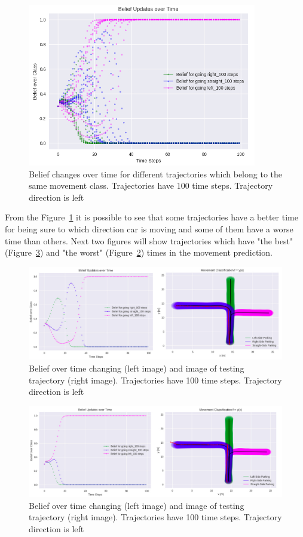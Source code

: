 \begin{figure}[H]
	\centering  	
	\includegraphics[width=10cm]{img/10_lefts.jpg}
	\caption{Belief changes over time for different trajectories which belong to the same movement class. Trajectories have 100 time steps. Trajectory direction is left}
	\label{fig:10Left}    
\end{figure}

From the Figure~\ref{fig:10Left} it is possible to see that some trajectories have a better time for being sure to which direction car is moving and some of them have a worse time than others. Next two figures will show trajectories which have "the best" (Figure~\ref{fig:LeftGood}) and "the worst" (Figure~\ref{fig:LeftBad}) times in the movement prediction.

\begin{figure}[H]
	\centering  	
	\includegraphics[width=15cm]{img/bad_left_tr.jpg}
	\caption{Belief over time changing (left image) and image of testing trajectory (right image). Trajectories have 100 time steps. Trajectory direction is left}
	\label{fig:LeftBad}    
\end{figure}

\begin{figure}[H]
	\centering  	
	\includegraphics[width=15cm]{img/good_left_tr.jpg}
	\caption{Belief over time changing (left image) and image of testing trajectory (right image). Trajectories have 100 time steps. Trajectory direction is left}
	\label{fig:LeftGood}    
\end{figure}

